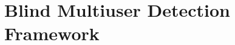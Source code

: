 \documentclass[a4paper,10pt,fleqn, twocolumn]{IEEETran}
\begin{document}
\section{Blind Multiuser Detection Framework\label{BMUD_model}}
\begin{figure} \label{MUD_model}
\end{figure}
\end{document}
